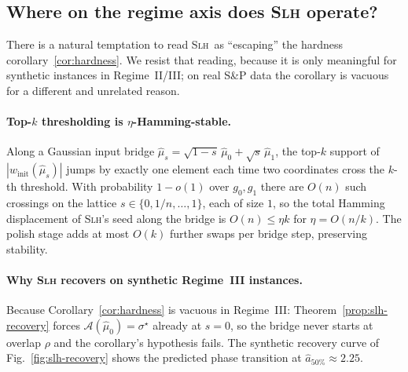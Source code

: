 \subsection{Where on the regime axis does \textsc{Slh} operate?}
\label{sec:slh-regime}

There is a natural temptation to read \textsc{Slh}\ as ``escaping'' the hardness
corollary~\ref{cor:hardness}. We resist that reading, because it is only meaningful for
synthetic instances in Regime~II/III; on real S\&P data the corollary is vacuous for a
different and unrelated reason.
 
\paragraph{Top-$k$ thresholding is $\eta$-Hamming-stable.}
Along a Gaussian input bridge $\hat\mu_s = \sqrt{1-s}\,\hat\mu_0 +
\sqrt{s}\,\hat\mu_1$, the top-$k$ support of $|w_{\mathrm{init}}(\hat\mu_s)|$
jumps by exactly one element each time two coordinates cross the $k$-th
threshold. With probability $1-o(1)$ over $g_0, g_1$ there are
$O(n)$ such crossings on the lattice $s\in\{0, 1/n, \ldots, 1\}$, each of
size $1$, so the total Hamming displacement of \textsc{Slh}'s seed along
the bridge is $O(n) \le \eta k$ for $\eta = O(n/k)$. The polish stage adds at most $O(k)$ further swaps per bridge step,
preserving stability.
 
\paragraph{Why \textsc{Slh} recovers on synthetic Regime~III instances.}
Because Corollary~\ref{cor:hardness} is vacuous in Regime~III:
Theorem~\ref{prop:slh-recovery} forces $\mathcal A(\hat\mu_0) = \sigma^\star$ already
at $s = 0$, so the bridge never starts at overlap $\rho$ and the corollary's
hypothesis fails. The synthetic recovery curve of Fig.~\ref{fig:slh-recovery} shows
the predicted phase transition at $\hat a_{50\%} \approx 2.25$.

